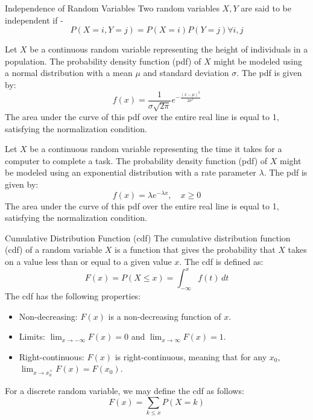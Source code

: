 \documentclass[openany]{book}
\begin{document}
\begin{mydefinition}{Independence of Random Variables}
    Two random variables $X, Y$ are said to be independent if - 
    $$P(X=i, Y=j) = P(X=i)P(Y=j) \forall i, j$$
\end{mydefinition}
\begin{example}
    Let $X$ be a continuous random variable representing the height of individuals in a population. The probability density function (pdf) of $X$ might be modeled using a normal distribution with a mean $\mu$ and standard deviation $\sigma$. The pdf is given by:
    $$f(x) = \frac{1}{\sigma \sqrt{2\pi}} e^{-\frac{(x - \mu)^2}{2\sigma^2}}$$
    The area under the curve of this pdf over the entire real line is equal to 1, satisfying the normalization condition.
\end{example}
\begin{example}
    Let $X$ be a continuous random variable representing the time it takes for a computer to complete a task. The probability density function (pdf) of $X$ might be modeled using an exponential distribution with a rate parameter $\lambda$. The pdf is given by:
    $$f(x) = \lambda e^{-\lambda x}, \quad x \geq 0$$
    The area under the curve of this pdf over the entire real line is equal to 1, satisfying the normalization condition.
\end{example}
\begin{mydefinition}{Cumulative Distribution Function (cdf)}
    The cumulative distribution function (cdf) of a random variable $X$ is a function that gives the probability that $X$ takes on a value less than or equal to a given value $x$. The cdf is defined as:
    $$F(x) = P(X \leq x) = \int_{-\infty}^{x} f(t) \, dt$$
    The cdf has the following properties:
    \begin{itemize}
        \item Non-decreasing: $F(x)$ is a non-decreasing function of $x$.
        \item Limits: $\lim_{x \to -\infty} F(x) = 0$ and $\lim_{x \to \infty} F(x) = 1$.
        \item Right-continuous: $F(x)$ is right-continuous, meaning that for any $x_0$, $\lim_{x \to x_0^+} F(x) = F(x_0)$.
    \end{itemize}
    For a discrete random variable, we may define the cdf as follows:
    $$F(x) = \sum_{k \leq x} P(X = k)$$
\end{mydefinition}
\end{document}
